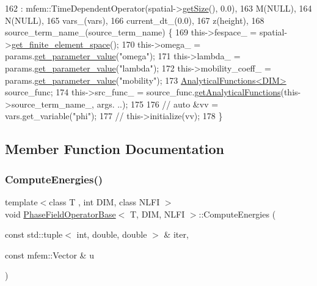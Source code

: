 \begin{DoxyCode}
162     : mfem::TimeDependentOperator(spatial->\hyperlink{classSpatialDiscretization_a2f23ae965741d678ef45c6a545ce9a9d}{getSize}(), 0.0),
163       M(NULL),
164       N(NULL),
165       vars\_(vars),
166       current\_dt\_(0.0),
167       z(height),
168       source\_term\_name\_(source\_term\_name) \{
169   this->fespace\_ = spatial->\hyperlink{classSpatialDiscretization_ac001fc2ff356fe8c0c2b49618e594a03}{get\_finite\_element\_space}();
170   this->omega\_ = params.\hyperlink{classParameters_ab1bac6bf07b9698c850542b68e143ef3}{get\_parameter\_value}(\textcolor{stringliteral}{"omega"});
171   this->lambda\_ = params.\hyperlink{classParameters_ab1bac6bf07b9698c850542b68e143ef3}{get\_parameter\_value}(\textcolor{stringliteral}{"lambda"});
172   this->mobility\_coeff\_ = params.\hyperlink{classParameters_ab1bac6bf07b9698c850542b68e143ef3}{get\_parameter\_value}(\textcolor{stringliteral}{"mobility"});
173   \hyperlink{classAnalyticalFunctions}{AnalyticalFunctions<DIM>} source\_func;
174   this->src\_func\_ = source\_func.\hyperlink{classAnalyticalFunctions_a88a27c868b872e12d16f1097779fd3f8}{getAnalyticalFunctions}(this->source\_term\_name\_, args.
      ..);
175 
176   \textcolor{comment}{// auto &vv = vars.get\_variable("phi");}
177   \textcolor{comment}{// this->initialize(vv);}
178 \}
\end{DoxyCode}


\subsection{Member Function Documentation}
\mbox{\label{classPhaseFieldOperatorBase_ac313363a74691d6b500191ff475b57fb}} 
\subsubsection{\texorpdfstring{Compute\+Energies()}{ComputeEnergies()}}
{\footnotesize\ttfamily template$<$class T , int D\+IM, class N\+L\+FI $>$ \\
void \hyperlink{classPhaseFieldOperatorBase}{Phase\+Field\+Operator\+Base}$<$ T, D\+IM, N\+L\+FI $>$\+::Compute\+Energies (\begin{DoxyParamCaption}\item[{const std\+::tuple$<$ int, double, double $>$ \&}]{iter,  }\item[{const mfem\+::\+Vector \&}]{u }\end{DoxyParamCaption})}




